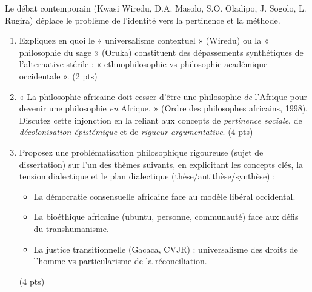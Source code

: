\documentclass[11pt]{article}
\begin{document}
\begin{exercice}
Le débat contemporain (Kwasi Wiredu, D.A. Masolo, S.O. Oladipo, J. Sogolo, L. Rugira) déplace le problème de l'identité vers la pertinence et la méthode.

\begin{enumerate}
    \item Expliquez en quoi le « universalisme contextuel » (Wiredu) ou la « philosophie du sage » (Oruka) constituent des dépassements synthétiques de l'alternative stérile : « ethnophilosophie vs philosophie académique occidentale ». (2 pts)
    \item « La philosophie africaine doit cesser d'être une philosophie \textit{de} l'Afrique pour devenir une philosophie \textit{en} Afrique. » (Ordre des philosophes africains, 1998). Discutez cette injonction en la reliant aux concepts de \textit{pertinence sociale}, de \textit{décolonisation épistémique} et de \textit{rigueur argumentative}. (4 pts)
    \item Proposez une problématisation philosophique rigoureuse (sujet de dissertation) sur l'un des thèmes suivants, en explicitant les concepts clés, la tension dialectique et le plan dialectique (thèse/antithèse/synthèse) :
    \begin{itemize}
        \item La démocratie consensuelle africaine face au modèle libéral occidental.
        \item La bioéthique africaine (ubuntu, personne, communauté) face aux défis du transhumanisme.
        \item La justice transitionnelle (Gacaca, CVJR) : universalisme des droits de l'homme vs particularisme de la réconciliation.
    \end{itemize}
    (4 pts)
\end{enumerate}
\end{exercice}
\end{document}
